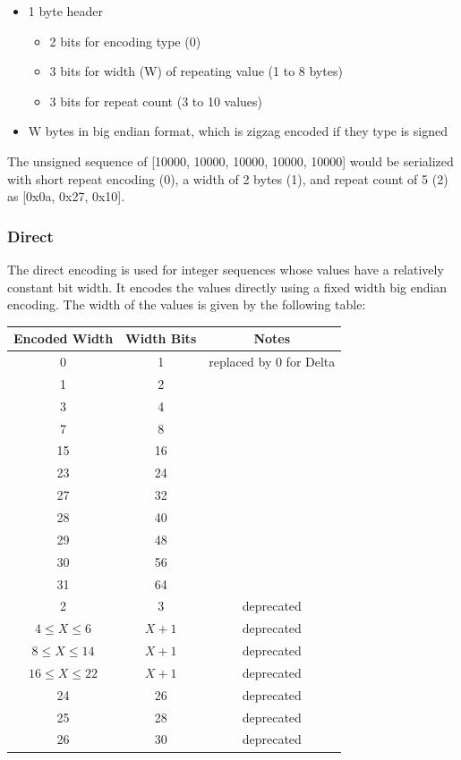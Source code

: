 \documentclass{article}
\begin{document}
\begin{itemize}
\item 1 byte header
  \begin{itemize}
  \item 2 bits for encoding type (0)
  \item 3 bits for width (W) of repeating value (1 to 8 bytes)
  \item 3 bits for repeat count (3 to 10 values)
  \end{itemize}
\item W bytes in big endian format, which is zigzag encoded if they type
  is signed
\end{itemize}

The unsigned sequence of [10000, 10000, 10000, 10000, 10000] would be
serialized with short repeat encoding (0), a width of 2 bytes (1), and
repeat count of 5 (2) as [0x0a, 0x27, 0x10].

\subsubsection{Direct}

The direct encoding is used for integer sequences whose values have a
relatively constant bit width. It encodes the values directly using a
fixed width big endian encoding.  The width of the values is given by
the following table:

\vspace{10pt}
\begin{tabular}{| c | c | c |}
\hline
Encoded Width & Width Bits & Notes\\
\hline
0 & 1 & replaced by 0 for Delta\\
1 & 2 & \\
3 & 4 & \\
7 & 8 & \\
15 & 16 & \\
23 & 24 & \\
27 & 32 & \\
28 & 40 & \\
29 & 48 & \\
30 & 56 & \\
31 & 64 & \\
\hline
2 & 3 & deprecated \\
$4 \leq X \leq 6$ & $X + 1$ & deprecated \\
$8 \leq X \leq 14$ & $X + 1$ & deprecated \\
$16 \leq X \leq 22$ & $X + 1$ & deprecated \\
24 & 26 & deprecated \\
25 & 28 & deprecated \\
26 & 30 & deprecated \\
\hline
\end{tabular}
\end{document}
